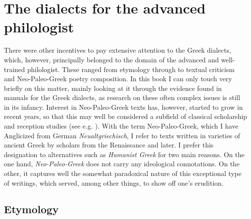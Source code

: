 \section{The dialects for the advanced philologist}\label{sec:3.2}

There were other incentives to pay extensive attention to the Greek dialects, which, however, principally belonged to the domain of the advanced and well-trained philologist. These ranged from etymology through to textual criticism and Neo-Paleo-Greek poetry composition. In this book I can only touch very briefly on this matter, mainly looking at it through the evidence found in manuals for the Greek dialects, as research on these often complex issues is still in its infancy. Interest in Neo-Paleo-Greek texts has, however, started to grow in recent years, so that this may well be considered a subfield of classical scholarship and reception studies (see e.g. \citealt{Pall2018}). With the term Neo-Paleo-Greek, which I have Anglicized from German \textit{Neualtgriechisch}, I refer to texts written in varieties of ancient Greek by scholars from the Renaissance and later. I prefer this designation to alternatives such as \textit{Humanist Greek} for two main reasons. On the one hand, \textit{Neo-Paleo-Greek} does not carry any ideological connotations. On the other, it captures well the somewhat paradoxical nature of this exceptional type of writings, which served, among other things, to show off one’s erudition.

\subsection{Etymology}

